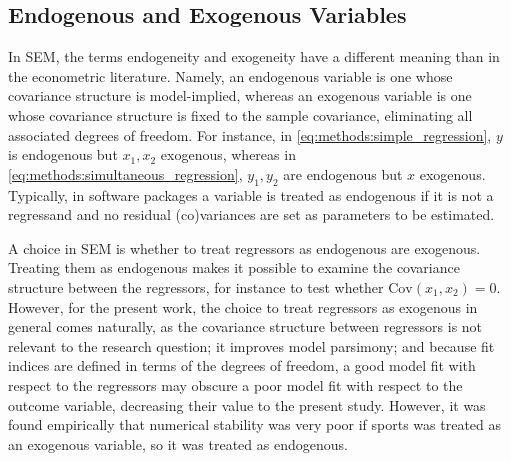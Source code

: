 \subsection{Endogenous and Exogenous Variables}
\label{sec:methods:endo_exo}
In SEM, the terms endogeneity and exogeneity have a different meaning than in the econometric literature.
Namely, an endogenous variable is one whose covariance structure is model-implied, whereas an exogenous variable is one
whose covariance structure is fixed to the sample covariance, eliminating all associated degrees of freedom.
For instance, in \cref{eq:methods:simple_regression}, $y$ is endogenous but $x_1, x_2$ exogenous, whereas in
\cref{eq:methods:simultaneous_regression}, $y_1, y_2$ are endogenous but $x$ exogenous.
Typically, in software packages a variable is treated as endogenous if it is not a regressand and no residual (co)variances
are set as parameters to be estimated.

A choice in SEM is whether to treat regressors as endogenous are exogenous. Treating them as endogenous makes it possible
to examine the covariance structure between the regressors, for instance to test whether $\text{Cov}(x_1, x_2) = 0$.
However, for the present work, the choice to treat regressors as exogenous in general comes naturally,
as the covariance structure between regressors is not relevant to the research question; it improves model parsimony;
and because fit indices are defined in terms of the degrees of freedom,
a good model fit with respect to the regressors may obscure a poor model fit with respect to the outcome variable,
decreasing their value to the present study.
However, it was found empirically that numerical stability was very poor if sports was treated as an exogenous variable,
so it was treated as endogenous.

